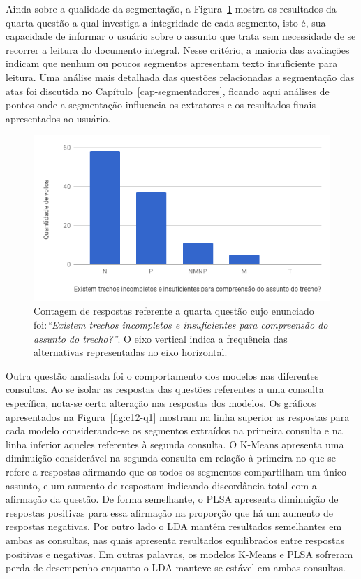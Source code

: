 Ainda sobre a qualidade da segmentação, a Figura~\ref{fig:Q4} mostra os resultados da quarta questão a qual investiga a integridade de cada segmento, isto é, sua capacidade de informar o usuário sobre o assunto que trata sem necessidade de se recorrer a leitura do documento integral. Nesse critério, a maioria das avaliações indicam que nenhum ou poucos segmentos apresentam texto insuficiente para leitura.  Uma análise mais detalhada das questões relacionadas a segmentação das atas foi discutida no Capítulo~\ref{cap-segmentadores}, ficando aqui análises de pontos onde a segmentação influencia os extratores e os resultados finais apresentados ao usuário.


\begin{figure}[!h] \centering     %

		\includegraphics[width=.48\textwidth]{conteudo/capitulos/figs/figuras-experimento/Q4-Seg.png}
	\caption{Contagem de respostas referente a quarta questão cujo enunciado foi:\textit{``Existem trechos incompletos e insuficientes para compreensão do assunto do trecho?''}. O eixo vertical indica a frequência das alternativas representadas no eixo horizontal. }
	\label{fig:Q4}
\end{figure}


Outra questão analisada foi o comportamento dos modelos nas diferentes consultas. Ao se isolar as respostas das questões referentes a uma consulta específica, nota-se certa alteração nas respostas dos modelos. 
Os gráficos apresentados na Figura~\ref{fig:c12-q1} mostram 
na linha superior 
as respostas para cada modelo considerando-se os segmentos extraídos na primeira consulta e na linha inferior aqueles referentes à segunda consulta. O K-Means apresenta uma diminuição considerável na segunda consulta em relação à primeira no que se refere a respostas afirmando que os todos os segmentos compartilham um único assunto, e um aumento de respostam indicando discordância total com a afirmação da questão.
De forma semelhante, o PLSA apresenta diminuição de respostas positivas para essa afirmação na proporção que há um aumento de respostas negativas. 
Por outro lado o LDA mantém resultados semelhantes em ambas as consultas, nas quais apresenta resultados equilibrados entre respostas positivas e negativas. Em outras palavras, os modelos K-Means e PLSA sofreram perda de desempenho enquanto o LDA manteve-se estável em ambas consultas.





